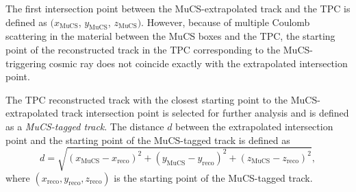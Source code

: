 \documentclass[a4paper,11pt]{article}
\begin{document}
The first intersection point between the MuCS-extrapolated track and the TPC is defined as $(x_{\mathrm{MuCS}}$, $y_{\mathrm{MuCS}}$, $z_{\mathrm{MuCS}})$. However, because of multiple Coulomb scattering in the material between the MuCS boxes and the TPC, the starting point of the reconstructed track in the TPC corresponding to the MuCS-triggering cosmic ray does not coincide exactly with the extrapolated intersection point.

The TPC reconstructed track with the closest starting point to the MuCS-extrapolated track intersection point is selected for further analysis and is defined as a \emph{MuCS-tagged track}.
The distance $d$ between the extrapolated intersection point and the starting point of the MuCS-tagged track is defined as
\begin{equation}\label{eq:d}
d = \sqrt{(x_{\mathrm{MuCS}}-x_{\mathrm{reco}})^2+(y_{\mathrm{MuCS}}-y_{\mathrm{reco}})^2+(z_{\mathrm{MuCS}}-z_{\mathrm{reco}})^2},
\end{equation}
where $(x_{\mathrm{reco}},y_{\mathrm{reco}},z_{\mathrm{reco}})$ is the starting point of the MuCS-tagged track.
\end{document}

